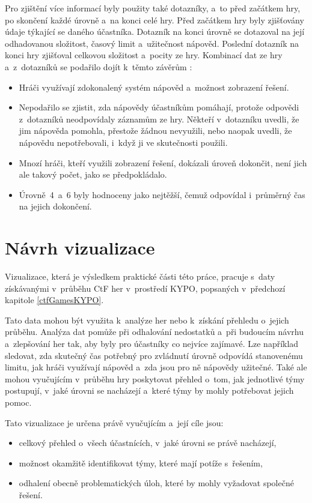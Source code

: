 \documentclass[
  digital, %
  oneside, %
  table,   %
  nolof,     %
  nolot,     %
]{fithesis3}
\begin{document}
Pro zjištění více informací byly použity také dotazníky, a~to před začátkem hry, po skončení každé úrovně a~na konci celé hry. Před začátkem hry byly zjišťovány údaje týkající se daného účastníka. Dotazník na konci úrovně se dotazoval na její odhadovanou složitost, časový limit a~užitečnost nápověd. Poslední dotazník na konci hry zjišťoval celkovou složitost a~pocity ze hry. Kombinací dat ze hry a~z~dotazníků se podařilo dojít k~těmto závěrům \cite{ctfDesign}:
\begin{itemize}
  \item Hráči využívají zdokonalený systém nápověd a~možnost zobrazení řešení.
  \item Nepodařilo se zjistit, zda nápovědy účastníkům pomáhají, protože odpovědi z~dotazníků neodpovídaly záznamům ze hry. Někteří v~dotazníku uvedli, že jim nápověda pomohla, přestože žádnou nevyužili, nebo naopak uvedli, že nápovědu nepotřebovali, i~když ji ve skutečnosti použili.
  \item Mnozí hráči, kteří využili zobrazení řešení, dokázali úroveň dokončit, není jich ale takový počet, jako se předpokládalo.
  \item Úrovně~4~a~6 byly hodnoceny jako nejtěžší, čemuž odpovídal i~průměrný čas na jejich dokončení.
\end{itemize}

\chapter{Návrh vizualizace}
Vizualizace, která je výsledkem praktické části této práce, pracuje s~daty získávanými v~průběhu CtF her v~prostředí KYPO, popsaných v~předchozí kapitole \ref{ctfGamesKYPO}.\par
Tato data mohou být využita k~analýze her nebo k~získání přehledu o~jejich průběhu. Analýza dat pomůže při odhalování nedostatků a~při budoucím návrhu a~zlepšování her tak, aby byly pro účastníky co nejvíce zajímavé. Lze například sledovat, zda skutečný čas potřebný pro zvládnutí úrovně odpovídá stanovenému limitu, jak hráči využívají nápověd a~zda jsou pro ně nápovědy užitečné. Také ale mohou vyučujícím v~průběhu hry poskytovat přehled o~tom, jak jednotlivé týmy postupují, v~jaké úrovni se nacházejí a~které týmy by mohly potřebovat jejich pomoc.\par
Tato vizualizace je určena právě vyučujícím a~její cíle jsou:
\begin{itemize}
  \item celkový přehled o~všech účastnících, v~jaké úrovni se právě nacházejí,
  \item možnost okamžitě identifikovat týmy, které mají potíže s~řešením,
  \item odhalení obecně problematických úloh, které by mohly vyžadovat společné řešení.
\end{itemize}
\end{document}

